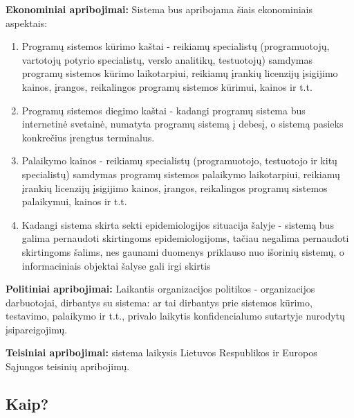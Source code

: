 \documentclass{VUMIFPSkursinis}
\begin{document}
\textbf{Ekonominiai apribojimai:}
Sistema bus apribojama šiais ekonominiais aspektais:
	\begin{enumerate}
		\item Programų sistemos kūrimo kaštai - reikiamų specialistų (programuotojų, vartotojų potyrio specialistų, verslo analitikų, testuotojų) samdymas programų sistemos kūrimo laikotarpiui, reikiamų įrankių licenzijų įsigijimo kainos, įrangos, reikalingos programų sistemos kūrimui, kainos ir t.t. 
		\item Programų sistemos diegimo kaštai - kadangi programų sistema bus internetinė svetainė, numatyta programų sistemą į debesį, o sistemą pasieks konkrečius įrengtus terminalus.
		\item Palaikymo kainos - reikiamų specialistų (programuotojo, testuotojo ir kitų specialistų) samdymas programų sistemos palaikymo laikotarpiui, reikiamų įrankių licenzijų įsigijimo kainos, įrangos, reikalingos programų sistemos palaikymui, kainos ir t.t.
		\item Kadangi sistema skirta sekti epidemiologijos situacija šalyje - sistemą bus galima pernaudoti skirtingoms epidemiologijoms, tačiau negalima pernaudoti skirtingoms šalims, nes gaunami duomenys priklauso nuo išorinių sistemų, o informaciniais objektai šalyse gali irgi skirtis 
	\end{enumerate}

\textbf{Politiniai apribojimai:} Laikantis organizacijos politikos - organizacijos darbuotojai, dirbantys su sistema: ar tai dirbantys prie sistemos kūrimo, testavimo, palaikymo ir t.t., privalo laikytis konfidencialumo sutartyje nurodytų įsipareigojimų.

\textbf{Teisiniai apribojimai:} sistema laikysis Lietuvos Respublikos ir Europos Sąjungos teisinių apribojimų.

\subsection{Kaip?}\label{sec:PSReqHow}
\end{document}

